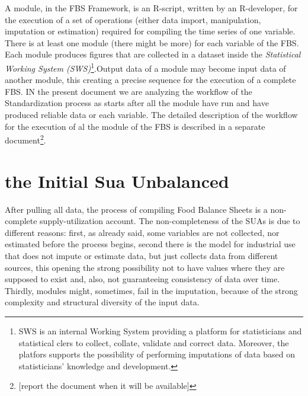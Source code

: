 \documentclass[]{article}
\let\rmarkdownfootnote\footnote%
\def\footnote{\protect\rmarkdownfootnote}
\begin{document}
A module, in the FBS Framework, is an R-script, written by an
R-developer, for the execution of a set of operations (either data
import, manipulation, imputation or estimation) required for compiling
the time series of one variable. There is at least one module (there
might be more) for each variable of the FBS. Each module produces
figures that are collected in a dataset inside the \emph{Statistical
Working System (SWS)}\footnote{SWS is an internal Working System
  providing a platform for statisticians and statistical clers to
  collect, collate, validate and correct data. Moreover, the platfors
  supports the possibility of performing imputations of data based on
  statisticians' knowledge and development.}.Output data of a module may
become input data of another module, this creating a precise sequence
for the execution of a complete FBS. IN the present document we are
analyzing the workflow of the Standardization process as starts after
all the module have run and have produced reliable data or each
variable. The detailed description of the workflow for the execution of
al the module of the FBS is described in a separate document\footnote{{[}report
  the document when it will be available{]}}.

\section{the Initial Sua Unbalanced}\label{the-initial-sua-unbalanced}

After pulling all data, the process of compiling Food Balance Sheets is
a non-complete supply-utilization account. The non-completeness of the
SUAs is due to different reasons: first, as already said, some variables
are not collected, nor estimated before the process begins, second there
is the model for industrial use that does not impute or estimate data,
but just collects data from different sources, this opening the strong
possibility not to have values where they are supposed to exist and,
also, not guaranteeing consistency of data over time. Thirdly, modules
might, sometimes, fail in the imputation, because of the strong
complexity and structural diversity of the input data.
\end{document}
